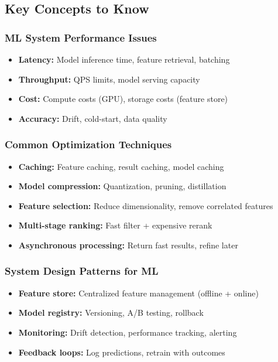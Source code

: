 \documentclass[11pt,letterpaper]{article}
\begin{document}
\subsection{Key Concepts to Know}

\subsubsection{ML System Performance Issues}
\begin{itemize}
    \item \textbf{Latency:} Model inference time, feature retrieval, batching
    \item \textbf{Throughput:} QPS limits, model serving capacity
    \item \textbf{Cost:} Compute costs (GPU), storage costs (feature store)
    \item \textbf{Accuracy:} Drift, cold-start, data quality
\end{itemize}

\subsubsection{Common Optimization Techniques}
\begin{itemize}
    \item \textbf{Caching:} Feature caching, result caching, model caching
    \item \textbf{Model compression:} Quantization, pruning, distillation
    \item \textbf{Feature selection:} Reduce dimensionality, remove correlated features
    \item \textbf{Multi-stage ranking:} Fast filter + expensive rerank
    \item \textbf{Asynchronous processing:} Return fast results, refine later
\end{itemize}

\subsubsection{System Design Patterns for ML}
\begin{itemize}
    \item \textbf{Feature store:} Centralized feature management (offline + online)
    \item \textbf{Model registry:} Versioning, A/B testing, rollback
    \item \textbf{Monitoring:} Drift detection, performance tracking, alerting
    \item \textbf{Feedback loops:} Log predictions, retrain with outcomes
\end{itemize}
\end{document}
